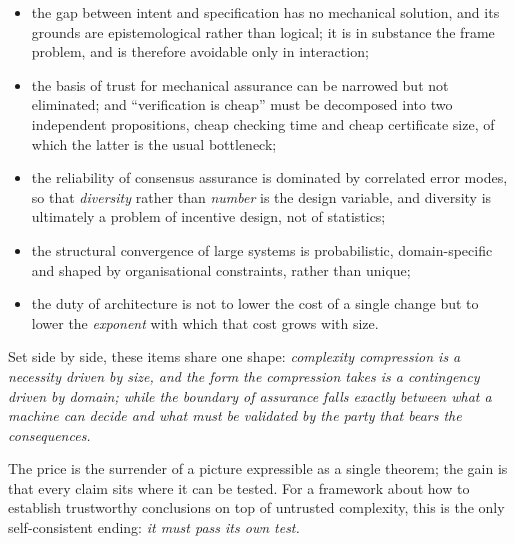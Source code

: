 \begin{itemize}
\item the gap between intent and specification has no mechanical solution, and its
      grounds are epistemological rather than logical; it is in substance the frame
      problem, and is therefore avoidable only in interaction;
\item the basis of trust for mechanical assurance can be narrowed but not eliminated;
      and ``verification is cheap'' must be decomposed into two independent propositions,
      cheap checking time and cheap certificate size, of which the latter is the usual
      bottleneck;
\item the reliability of consensus assurance is dominated by correlated error modes, so
      that \emph{diversity} rather than \emph{number} is the design variable, and
      diversity is ultimately a problem of incentive design, not of statistics;
\item the structural convergence of large systems is probabilistic, domain-specific and
      shaped by organisational constraints, rather than unique;
\item the duty of architecture is not to lower the cost of a single change but to lower
      the \emph{exponent} with which that cost grows with size.
\end{itemize}

Set side by side, these items share one shape: \emph{complexity compression is a
necessity driven by size, and the form the compression takes is a contingency driven by
domain; while the boundary of assurance falls exactly between what a machine can decide
and what must be validated by the party that bears the consequences.}

The price is the surrender of a picture expressible as a single theorem; the gain is that
every claim sits where it can be tested. For a framework about how to establish
trustworthy conclusions on top of untrusted complexity, this is the only self-consistent
ending: \emph{it must pass its own test.}
